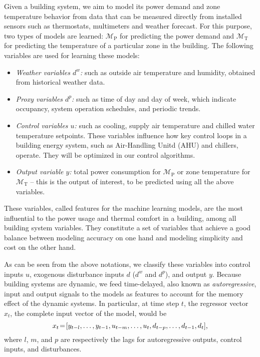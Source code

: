 Given a building system, we aim to model its power demand and zone temperature behavior from data that can be measured directly from installed sensors such as thermostats, multimeters and weather forecast.
For this purpose, two types of models are learned: \(\mathcal{M}_{\mathrm{P}}\) for predicting the power demand and \(\mathcal{M}_{\mathrm{T}}\) for predicting the temperature of a particular zone in the building.
The following variables are used for learning these models:
\begin{itemize}
\item \textit{Weather variables \(d^w\):} such as outside air temperature and humidity, obtained from historical weather data.
\item \textit{Proxy variables \(d^p\):} such as time of day and day of week, which indicate occupancy, system operation schedules, and periodic trends.
\item \textit{Control variables \(u\):} such as cooling, supply air temperature and chilled water temperature setpoints.  These variables influence how key control loops in a building energy system, such as Air-Handling Unitd (AHU) and chillers, operate.  They will be optimized in our control algorithms.
\item \textit{Output variable \(y\):} total power consumption for \(\mathcal{M}_{\mathrm{P}}\) or zone temperature for \(\mathcal{M}_{\mathrm{T}}\) -- this is the output of interest, to be predicted using all the above variables.
\end{itemize}
These variables, called features for the machine learning models, are the most influential to the power usage and thermal comfort in a building, among all building system variables.
They constitute a set of variables that achieve a good balance between modeling accuracy on one hand and modeling simplicity and cost on the other hand.


As can be seen from the above notations, we classify these variables into control inputs \(u\), exogenous disturbance inputs \(d\) ($d^{w}$ and $d^{p}$), and output \(y\).
Because building systems are dynamic, we feed time-delayed, also known as \emph{autoregressive}, input and output signals to the models as features to account for the memory effect of the dynamic systems.
In particular, at time step $t$, the regressor vector $x_{t}$, \ie the complete input vector of the model, would be
\begin{equation}
  \label{E:GP:features}
  x_{t}\!=\![y_{t-l}, \dots, y_{t-1}, u_{t-m}, \dots, u_t, d_{t-p}, \dots, d_{t-1}, d_t] \text,
\end{equation}
where \(l\), \(m\), and \(p\) are respectively the lags for autoregressive outputs, control inputs, and disturbances.

